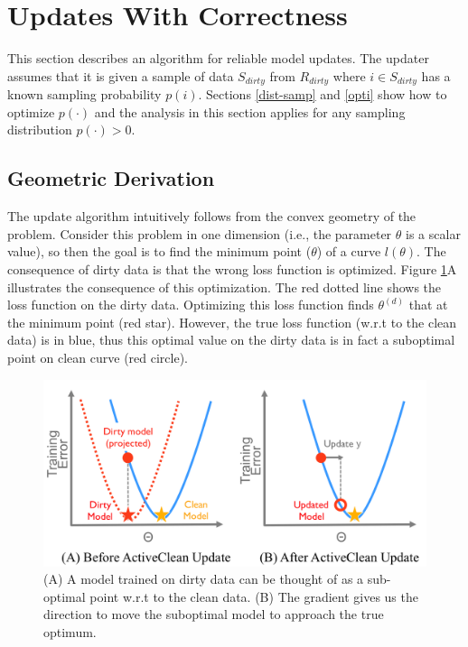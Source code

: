\section{Updates With Correctness}\label{model-update}
This section describes an algorithm for reliable model updates.
The updater assumes that it is given a sample of data $S_{dirty}$ from $R_{dirty}$ where $i \in S_{dirty}$ has a known sampling probability $p(i)$.
Sections \ref{dist-samp} and \ref{opti} show how to optimize $p(\cdot)$ and the analysis in this section applies for any sampling distribution $p(\cdot) > 0$.

\subsection{Geometric Derivation}
The update algorithm intuitively follows from the convex geometry of the problem.
Consider this problem in one dimension (i.e., the parameter $\theta$ is a scalar value), so then the goal is to find the minimum point ($\theta$) of a curve $l(\theta)$.
The consequence of dirty data is that the wrong loss function is optimized.
Figure \ref{update-arch2}A illustrates the consequence of this optimization.
The red dotted line shows the loss function on the dirty data.
Optimizing this loss function finds $\theta^{(d)}$ that at the minimum point (red star).
However, the true loss function (w.r.t to the clean data) is in blue, thus
this optimal value on the dirty data is in fact a suboptimal point on clean curve (red circle).

\begin{figure}[ht!]
\centering
 \includegraphics[width=\columnwidth]{figs/update-arch2.png}\vspace{-1em}
 \caption{(A) A model trained on dirty data can be thought of as a sub-optimal point w.r.t to the clean data. (B) The gradient gives us the direction to move the suboptimal model to approach the true optimum. \label{update-arch2}}\vspace{-1em}
\end{figure}

